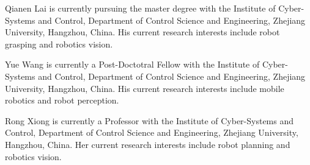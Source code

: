 \documentclass[journal]{IEEEtran}
\begin{document}

\vspace*{-5mm}

\begin{IEEEbiography}{Qianen Lai}
is currently pursuing the master degree with the Institute of Cyber-Systems and Control, Department of Control Science and Engineering, Zhejiang University, Hangzhou, China. His current research interests include robot grasping and robotics vision.
\end{IEEEbiography}

\vspace*{-5mm}

\begin{IEEEbiography}{Yue Wang}
 is currently a Post-Doctotral Fellow with the Institute of Cyber-Systems and Control, Department of Control Science and Engineering, Zhejiang University, Hangzhou, China. His current research interests include mobile robotics and robot perception.
\end{IEEEbiography}

\vspace*{-5mm}

\begin{IEEEbiography}{Rong Xiong}
is currently a Professor with the Institute of Cyber-Systems and Control, Department of Control Science and Engineering, Zhejiang University, Hangzhou, China. Her current research interests include robot planning and robotics vision.
\end{IEEEbiography}
\end{document}
